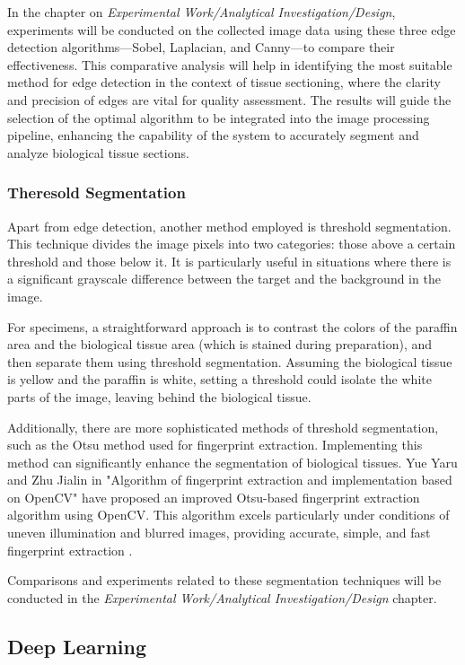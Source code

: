 In the chapter on \textit{Experimental Work/Analytical Investigation/Design}, experiments will be conducted on the collected image data using these three edge detection algorithms—Sobel, Laplacian, and Canny—to compare their effectiveness. This comparative analysis will help in identifying the most suitable method for edge detection in the context of tissue sectioning, where the clarity and precision of edges are vital for quality assessment. The results will guide the selection of the optimal algorithm to be integrated into the image processing pipeline, enhancing the capability of the system to accurately segment and analyze biological tissue sections.

\subsubsection{Theresold Segmentation}

Apart from edge detection, another method employed is threshold segmentation. This technique divides the image pixels into two categories: those above a certain threshold and those below it. It is particularly useful in situations where there is a significant grayscale difference between the target and the background in the image.

For specimens, a straightforward approach is to contrast the colors of the paraffin area and the biological tissue area (which is stained during preparation), and then separate them using threshold segmentation. Assuming the biological tissue is yellow and the paraffin is white, setting a threshold could isolate the white parts of the image, leaving behind the biological tissue.

Additionally, there are more sophisticated methods of threshold segmentation, such as the Otsu method used for fingerprint extraction. Implementing this method can significantly enhance the segmentation of biological tissues. Yue Yaru and Zhu Jialin in "Algorithm of fingerprint extraction and implementation based on OpenCV" have proposed an improved Otsu-based fingerprint extraction algorithm using OpenCV. This algorithm excels particularly under conditions of uneven illumination and blurred images, providing accurate, simple, and fast fingerprint extraction \cite{3.3}.

Comparisons and experiments related to these segmentation techniques will be conducted in the \textit{Experimental Work/Analytical Investigation/Design} chapter.

\subsection{Deep Learning}

